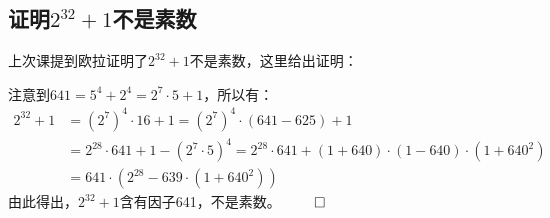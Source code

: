 ﻿\documentclass[11pt]{article}
\renewenvironment{proof}{{\noindent\hskip 2em \bf 证明 \quad}}{\hfill$\qed$\par}
\begin{document}
    \subsection{证明$2^{32}+1$不是素数}
    上次课提到欧拉证明了$2^{32}+1$不是素数，这里给出证明：

    \begin{proof}
        注意到$641=5^4+2^4=2^7\cdot 5+1$，所以有：
        \begin{align*}
            2^{32}+1&=(2^7)^4\cdot16+1=(2^7)^4\cdot(641-625)+1\\
            &=2^{28}\cdot641+1-(2^7\cdot5)^4=2^{28}\cdot 641+(1+640)\cdot(1-640)\cdot(1+640^2)\\
            &=641\cdot (2^{28}-639\cdot(1+640^2))
        \end{align*}
        由此得出，$2^{32}+1$含有因子641，不是素数。
    \end{proof}
\end{document}
